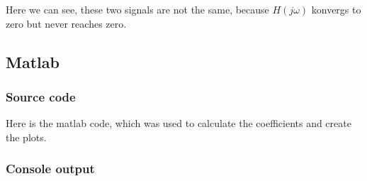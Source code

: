 \documentclass[a4paper]{article}
\begin{document}
Here we can see, these two signals are not the same, because $H(j\omega)$ konvergs to zero but never reaches zero.

\newpage
\subsection{Matlab}
\subsubsection{Source code}
Here is the matlab code, which was used to calculate the coefficients and create the plots.

\subsubsection{Console output}

\end{document}
